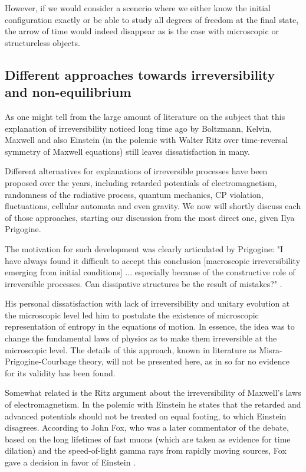 \documentclass[a4paper,12pt]{article}
\begin{document}
However, if we would consider a scenerio where we either know the initial configuration exactly or be able to study all degrees of freedom at the final state, the arrow of time would indeed disappear as is the case with microscopic or structureless objects.

\subsection{Different approaches towards irreversibility and non-equilibrium}

As one might tell from the large amount of literature on the subject \cite{Doyle:wf} \cite{Layzer:1970dx} \cite{Wolfram:552851} \cite{Rovelli:2015tv} \cite{Courbage:1983eo} %
 that this explanation of irreversibility noticed long time ago by Boltzmann, Kelvin, Maxwell \cite{Wolfram:552851} and also Einstein (in the polemic with Walter Ritz over time-reversal symmetry of Maxwell equations) still leaves dissatisfaction in many.

Different alternatives for explanations of irreversible processes have been proposed over the years, including retarded potentials of electromagnetism, randomness of the radiative process, quantum mechanics, CP violation, fluctuations, cellular automata and even gravity. We now will shortly discuss each of those approaches, starting our discussion from the most direct one, given Ilya Prigogine.

The motivation for such development was clearly articulated by Prigogine:
"I have always found it difficult to accept this conclusion [macroscopic irreversibility emerging from initial conditions] {...} especially because of the constructive role of irreversible processes. Can dissipative structures be the result of mistakes?" \cite{Prigogine:1978kz}.

His personal dissatisfaction with lack of irreversibility and unitary evolution at the microscopic level led him to postulate the existence of microscopic representation of entropy in the equations of motion. 
In essence, the idea was to change the fundamental laws of physics as to make them irreversible at the microscopic level. The details of this approach, known in literature as Misra-Prigogine-Courbage theory\cite{Courbage:1983eo}, will not be presented here, as in so far no evidence for its validity has been found\cite{Bricmont:7zJsfTpK}.

Somewhat related is the Ritz argument about the irreversibility of Maxwell's laws of electromagnetism. In the polemic with Einstein he states that the retarded and advanced potentials should not be treated on equal footing, to which Einstein disagrees. 
According to John Fox, who was a later commentator of the debate, based on the long lifetimes of fast muons (which are taken as evidence for time dilation) and the speed-of-light gamma rays from rapidly moving sources, Fox gave a decision in favor of Einstein \cite{Fox:1965bg}.
\end{document}
